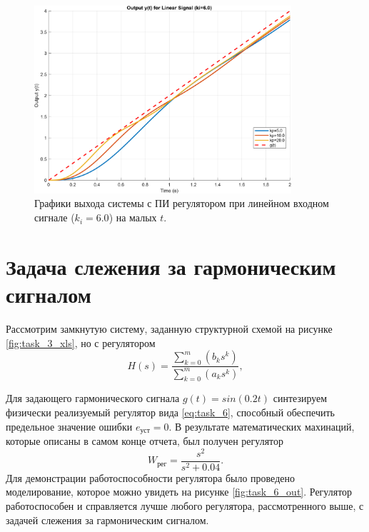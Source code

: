 \begin{figure}[H]
    \centering
    \includegraphics[width=0.85\textwidth]{figs/task_5_output_linear_small_t_ki_6.0.png}
    \caption{Графики выхода системы с ПИ регулятором при линейном входном сигнале (\( k_i = 6.0 \)) на малых $t$.}
    \label{fig:task_5_output_ki_6.0}
\end{figure}




\section{Задача слежения за гармоническим сигналом}

Рассмотрим замкнутую систему, заданную структурной схемой на рисунке \ref{fig:task_3_xls},
но с регулятором
\begin{equation}
    H(s)=\frac{\sum_{k=0}^m(b_ks^k)}{\sum_{k=0}^m(a_ks^k)},
    \label{eq:task_6}
\end{equation}

Для задающего гармонического сигнала $g(t) = sin(0.2t)$ синтезируем
физически реализуемый регулятор вида \ref{eq:task_6}, способный обеспечить предельное значение 
ошибки $e_\text{уст} = 0$. В результате математических махинаций, которые описаны в самом
конце отчета, был получен регулятор
\begin{equation*}
    W_\text{рег}=\frac{s^2}{s^2+0.04}.
\end{equation*}
Для демонстрации работоспособности регулятора было проведено моделирование, которое
можно увидеть на рисунке \ref{fig:task_6_out}. Регулятор работоспособен и справляется
лучше любого регулятора, рассмотренного выше, с задачей слежения за гармоническим
сигналом.

